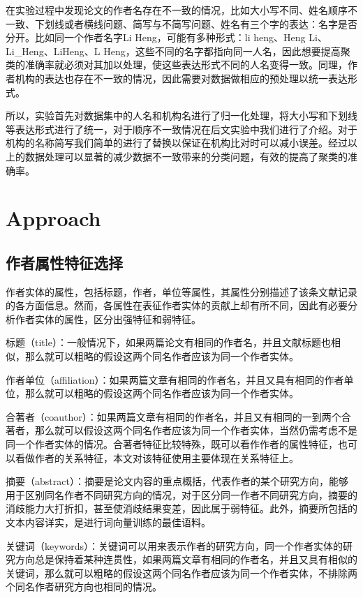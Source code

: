 \documentclass[sigchi]{acmart}
\begin{document}
在实验过程中发现论文的作者名存在不一致的情况，比如大小写不同、姓名顺序不一致、下划线或者横线问题、简写与不简写问题、姓名有三个字的表达：名字是否分开。比如同一个作者名字Li Heng，可能有多种形式：li heng、Heng Li、Li\_Heng、LiHeng、L Heng，这些不同的名字都指向同一人名，因此想要提高聚类的准确率就必须对其加以处理，使这些表达形式不同的人名变得一致。同理，作者机构的表达也存在不一致的情况，因此需要对数据做相应的预处理以统一表达形式。

所以，实验首先对数据集中的人名和机构名进行了归一化处理，将大小写和下划线等表达形式进行了统一，对于顺序不一致情况在后文实验中我们进行了介绍。对于机构的名称简写我们简单的进行了替换以保证在机构比对时可以减小误差。经过以上的数据处理可以显著的减少数据不一致带来的分类问题，有效的提高了聚类的准确率。


\section{Approach}
\subsection{作者属性特征选择}
作者实体的属性，包括标题，作者，单位等属性，其属性分别描述了该条文献记录的各方面信息。然而，各属性在表征作者实体的贡献上却有所不同，因此有必要分析作者实体的属性，区分出强特征和弱特征。

标题（title）：一般情况下，如果两篇论文有相同的作者名，并且文献标题也相似，那么就可以粗略的假设这两个同名作者应该为同一个作者实体。

作者单位（affiliation）：如果两篇文章有相同的作者名，并且又具有相同的作者单位，那么就可以粗略的假设这两个同名作者应该为同一个作者实体。

合著者（coauthor）：如果两篇文章有相同的作者名，并且又有相同的一到两个合著者，那么就可以假设这两个同名作者应该为同一个作者实体，当然仍需考虑不是同一个作者实体的情况。合著者特征比较特殊，既可以看作作者的属性特征，也可以看做作者的关系特征，本文对该特征使用主要体现在关系特征上。

摘要（abstract）：摘要是论文内容的重点概括，代表作者的某个研究方向，能够用于区别同名作者不同研究方向的情况，对于区分同一作者不同研究方向，摘要的消歧能力大打折扣，甚至使消歧结果变差，因此属于弱特征。此外，摘要所包括的文本内容详实，是进行词向量训练的最佳语料。

关键词（keywords）：关键词可以用来表示作者的研究方向，同一个作者实体的研究方向总是保持着某种连贯性，如果两篇文章有相同的作者名，并且又具有相似的关键词，那么就可以粗略的假设这两个同名作者应该为同一个作者实体，不排除两个同名作者研究方向也相同的情况。
\end{document}
